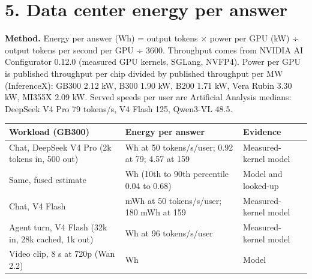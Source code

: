\documentclass[10pt,letterpaper]{article}
\newcounter{none}
\begin{document}
\section{5. Data center energy per
answer}\label{data-center-energy-per-answer}

\textbf{Method.} Energy per answer (Wh) = output tokens × power per GPU
(kW) ÷ output tokens per second per GPU ÷ 3600. Throughput comes from
NVIDIA AI Configurator 0.12.0 (measured GPU kernels, SGLang, NVFP4).
Power per GPU is published throughput per chip divided by published
throughput per MW (InferenceX): GB300 2.12 kW, B300 1.90 kW, B200 1.71
kW, Vera Rubin 3.30 kW, MI355X 2.09 kW. Served speeds per user are
Artificial Analysis medians: DeepSeek V4 Pro 79 tokens/s, V4 Flash 125,
Qwen3-VL 48.5.

{\def\LTcaptype{none} %
{\footnotesize\setlength{\tabcolsep}{3.8pt}\renewcommand{\arraystretch}{1.15}
\begin{longtable}[]{@{}
  >{\raggedright\arraybackslash}p{}
  >{\raggedright\arraybackslash}p{}
  >{\raggedright\arraybackslash}p{}@{}}
\toprule\noalign{}
\begin{minipage}[b]{\linewidth}\raggedright
\textbf{Workload (GB300)}
\end{minipage} & \begin{minipage}[b]{\linewidth}\raggedright
\textbf{Energy per answer}
\end{minipage} & \begin{minipage}[b]{\linewidth}\raggedright
\textbf{Evidence}
\end{minipage} \\
\midrule\noalign{}
\endhead
\bottomrule\noalign{}
\endlastfoot
Chat, DeepSeek V4 Pro (2k tokens in, 500 out) & 0.32 Wh at 50
tokens/s/user; 0.92 at 79; 4.57 at 159 & Measured-kernel model \\
Same, fused estimate & 0.20 Wh (10th to 90th percentile 0.04 to 0.68) &
Model and looked-up \\
Chat, V4 Flash & 49 mWh at 50 tokens/s/user; 180 mWh at 159 &
Measured-kernel model \\
Agent turn, V4 Flash (32k in, 28k cached, 1k out) & 0.16 Wh at 96
tokens/s/user & Measured-kernel model \\
Video clip, 8 s at 720p (Wan 2.2) & 390 Wh & Model \\
\end{longtable}
}
}
\end{document}
